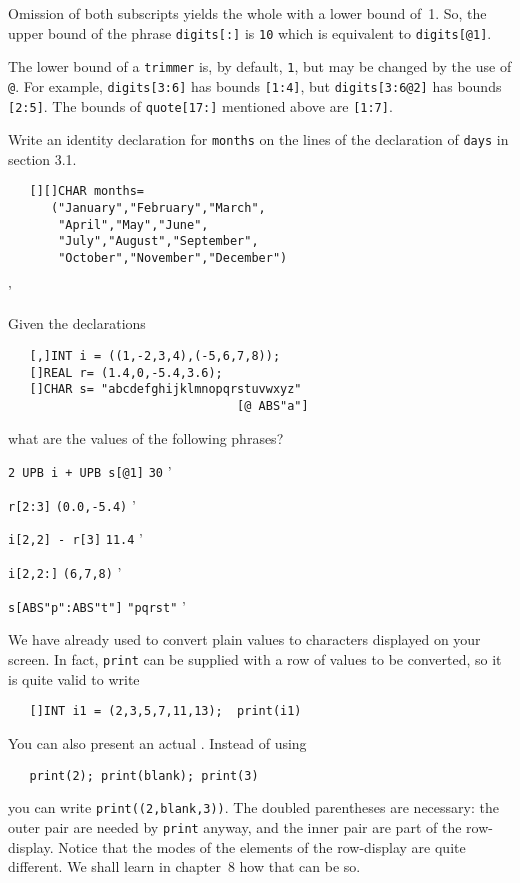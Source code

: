 Omission of both subscripts yields the whole  with a lower
bound of~1. So, the upper bound of the phrase \verb|digits[:]| is
\verb|10| which is equivalent to \verb|digits[@1]|.

The lower bound of a \verb|trimmer| is, by default, \verb|1|, but may
be changed by the use of \verb|@|. For example, \verb|digits[3:6]|
has bounds \verb|[1:4]|, but \verb|digits[3:6@2]| has bounds
\verb|[2:5]|. The bounds of \verb|quote[17:]| mentioned above are
\verb|[1:7]|.

\begin{exercise}
\item Write an identity declaration for \verb|months| on the lines of
the declaration of \verb|days| in section 3.1.
\ans \ %
\begin{verbatim}
   [][]CHAR months=
      ("January","February","March",
       "April","May","June",
       "July","August","September",
       "October","November","December")
\end{verbatim}
'
\item Given the declarations
\begin{verbatim}
   [,]INT i = ((1,-2,3,4),(-5,6,7,8));
   []REAL r= (1.4,0,-5.4,3.6);
   []CHAR s= "abcdefghijklmnopqrstuvwxyz"
                                [@ ABS"a"]
\end{verbatim}
\noindent
what are the values of the following phrases?
\begin{subex}
\item \verb|2 UPB i + UPB s[@1]| \subans \verb|30|
'
\item \verb|r[2:3]| \subans \verb|(0.0,-5.4)|
'
\item \verb|i[2,2] - r[3]| \subans \verb|11.4|
'
\item \verb|i[2,2:]| \subans \verb|(6,7,8)|
'
\item \verb|s[ABS"p":ABS"t"]| \subans \verb|"pqrst"|
'
\end{subex}
\end{exercise}

We have already used  to convert plain values to
characters displayed on your screen. In fact, \verb|print| can be
supplied with a row of values to be converted, so it is quite valid
to write
\begin{verbatim}
   []INT i1 = (2,3,5,7,11,13);  print(i1)
\end{verbatim}
\noindent
You can also present an actual . Instead of using
\begin{verbatim}
   print(2); print(blank); print(3)
\end{verbatim}
\noindent
you can write \verb|print((2,blank,3))|. The doubled parentheses are
necessary: the outer pair are needed by \verb|print| anyway, and the
inner pair are part of the row-display. Notice that the modes of the
elements of the row-display are quite different. We shall learn in
chapter~8 how that can be so.

